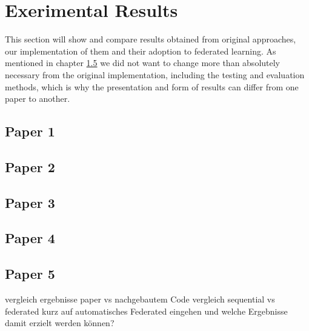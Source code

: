 \section{Exerimental Results}
This section will show and compare results obtained from original approaches, our implementation of them and their adoption to federated learning. As mentioned in chapter \ref{} we did not want to change more than absolutely necessary from the original implementation, including the testing and evaluation methods, which is why the presentation and form of results can differ from one paper to another.

\subsection{Paper 1}
\subsection{Paper 2}
\subsection{Paper 3}
\subsection{Paper 4}
\subsection{Paper 5}
vergleich ergebnisse paper vs nachgebautem Code
vergleich sequential vs federated
kurz auf automatisches Federated eingehen und welche Ergebnisse damit erzielt werden können?

